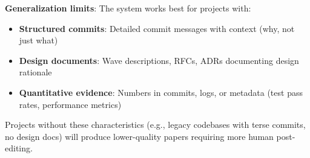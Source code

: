 \textbf{Generalization limits}: The system works best for projects with:
\begin{itemize}
\item \textbf{Structured commits}: Detailed commit messages with context (why, not just what)
\item \textbf{Design documents}: Wave descriptions, RFCs, ADRs documenting design rationale
\item \textbf{Quantitative evidence}: Numbers in commits, logs, or metadata (test pass rates, performance metrics)
\end{itemize}

Projects without these characteristics (e.g., legacy codebases with terse commits, no design docs) will produce lower-quality papers requiring more human post-editing.